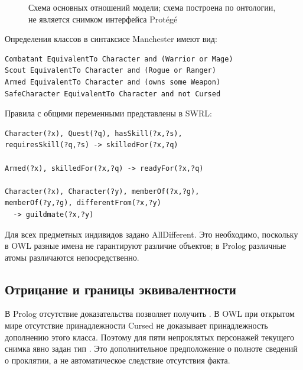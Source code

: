 \begin{figure}[H]
\centering
{}
\caption{Схема основных отношений модели; схема построена по онтологии, не является снимком интерфейса Protégé}
\end{figure}

Определения классов в синтаксисе Manchester имеют вид:
\begin{lstlisting}
Combatant EquivalentTo Character and (Warrior or Mage)
Scout EquivalentTo Character and (Rogue or Ranger)
Armed EquivalentTo Character and (owns some Weapon)
SafeCharacter EquivalentTo Character and not Cursed
\end{lstlisting}
Правила с общими переменными представлены в SWRL:
\begin{lstlisting}
Character(?x), Quest(?q), hasSkill(?x,?s),
requiresSkill(?q,?s) -> skilledFor(?x,?q)

Armed(?x), skilledFor(?x,?q) -> readyFor(?x,?q)

Character(?x), Character(?y), memberOf(?x,?g),
memberOf(?y,?g), differentFrom(?x,?y)
  -> guildmate(?x,?y)
\end{lstlisting}
Для всех предметных индивидов задано AllDifferent. Это необходимо, поскольку в OWL разные имена не гарантируют различие объектов; в Prolog различные атомы различаются непосредственно.

\subsection{Отрицание и границы эквивалентности}
В Prolog отсутствие доказательства  позволяет получить . В OWL при открытом мире отсутствие принадлежности Cursed не доказывает принадлежность дополнению этого класса. Поэтому для пяти непроклятых персонажей текущего снимка явно задан тип . Это дополнительное предположение о полноте сведений о проклятии, а не автоматическое следствие отсутствия факта.

